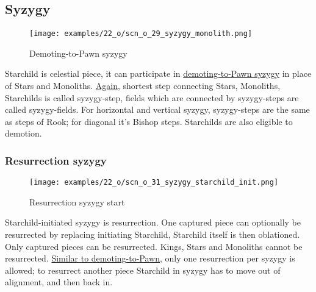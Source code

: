 \subsection*{Syzygy}

\vspace*{-1.3\baselineskip}
\noindent
\begin{figure}[!h]
\texttt{[image: examples/22\_o/scn\_o\_29\_syzygy\_monolith.png]}
\caption{Demoting-to-Pawn syzygy}
\label{fig:scn_o_29_syzygy_monolith}
\end{figure}

Starchild is celestial piece, it can participate in
\hyperref[fig:scn_d_19_syzygy_2_stars_init]{demoting-to-Pawn syzygy} in place of
Stars and Monoliths.
\hyperref[fig:scn_d_21_syzygy_2_monoliths_init]{Again}, shortest step connecting
Stars, Monoliths, Starchilds is called syzygy-step, fields which are connected by
syzygy-steps are called syzygy-fields. For horizontal and vertical syzygy,
syzygy-steps are the same as steps of Rook; for diagonal it's Bishop steps.
Starchilds are also eligible to demotion.

\clearpage %

\subsubsection*{Resurrection syzygy}

\vspace*{-1.5\baselineskip}
\noindent
\begin{figure}[!h]
\texttt{[image: examples/22\_o/scn\_o\_31\_syzygy\_starchild\_init.png]}
\vspace*{-1.4\baselineskip}
\caption{Resurrection syzygy start}
\label{fig:scn_o_31_syzygy_starchild_init}
\end{figure}

\vspace*{-0.5\baselineskip}
Starchild-initiated syzygy is resurrection. One captured piece can optionally be
resurrected by replacing initiating Starchild, Starchild itself is then oblationed.
Only captured pieces can be resurrected. Kings, Stars and Monoliths cannot be
resurrected.
\hyperref[fig:scn_d_20_syzygy_2_stars_steps]{Similar to demoting-to-Pawn}, only one
resurrection per syzygy is allowed; to resurrect another piece Starchild in syzygy
has to move out of alignment, and then back in.

